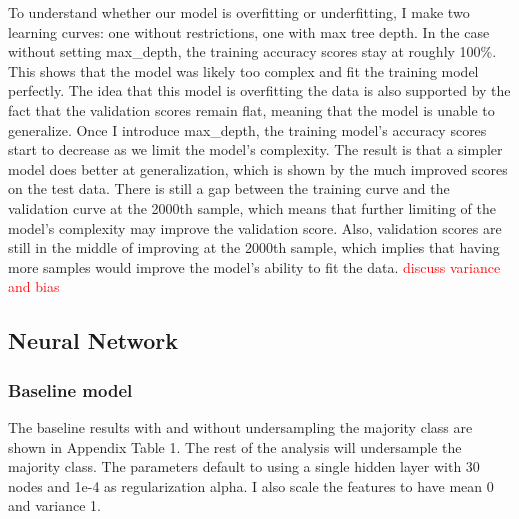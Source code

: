 \documentclass{article}
\newcommand\todo[1]{\textcolor{red}{#1}}
\begin{document}
To understand whether our model is overfitting or underfitting, I make two learning curves: one without restrictions, one with max tree depth. In the case without setting max\_depth, the training accuracy scores stay at roughly 100\%. This shows that the model was likely too complex and fit the training model perfectly. The idea that this model is overfitting the data is also supported by the fact that the validation scores remain flat, meaning that the model is unable to generalize. Once I introduce max\_depth, the training model's accuracy scores start to decrease as we limit the model's complexity. The result is that a simpler model does better at generalization, which is shown by the much improved scores on the test data. There is still a gap between the training curve and the validation curve at the 2000th sample, which means that further limiting of the model's complexity may improve the validation score. Also, validation scores are still in the middle of improving at the 2000th sample, which implies that having more samples would improve the model's ability to fit the data. \todo{discuss variance and bias}

\subsection{Neural Network}

\subsubsection*{Baseline model}

The baseline results with and without undersampling the majority class are shown in Appendix Table 1. The rest of the analysis will undersample the majority class. The parameters default to using a single hidden layer with 30 nodes and 1e-4 as regularization alpha. I also scale the features to have mean 0 and variance 1. 
\end{document}
